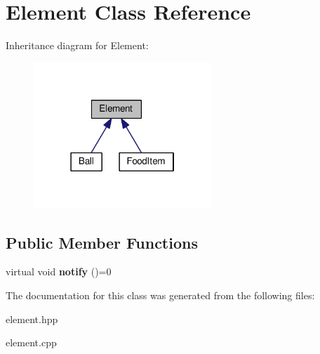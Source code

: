 \hypertarget{classElement}{}\section{Element Class Reference}
\label{classElement}


Inheritance diagram for Element\+:
\nopagebreak
\begin{figure}[H]
\begin{center}
\leavevmode
\includegraphics[width=190pt]{classElement__inherit__graph}
\end{center}
\end{figure}
\subsection*{Public Member Functions}
\begin{DoxyCompactItemize}
\item 
virtual void {\bfseries notify} ()=0\hypertarget{classElement_a3374a4e8de32e7f1c80d63deaec4d1b2}{}\label{classElement_a3374a4e8de32e7f1c80d63deaec4d1b2}

\end{DoxyCompactItemize}


The documentation for this class was generated from the following files\+:\begin{DoxyCompactItemize}
\item 
element.\+hpp\item 
element.\+cpp\end{DoxyCompactItemize}

